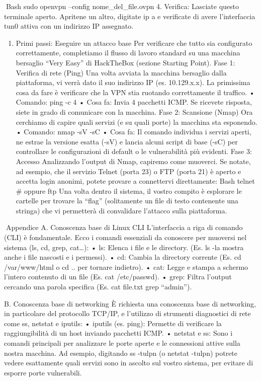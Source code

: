 \documentclass[11pt,a4paper]{article}
\providecommand{\tightlist}{%
  \setlength{\itemsep}{0pt}\setlength{\parskip}{0pt}}
\begin{document}
Bash sudo openvpn --config nome\_del\_file.ovpn 4. Verifica: Lasciate
questo terminale aperto. Apritene un altro, digitate ip a e verificate
di avere l'interfaccia tun0 attiva con un indirizzo IP assegnato.

\begin{enumerate}
\def\labelenumi{\arabic{enumi}.}
\setcounter{enumi}{4}
\tightlist
\item
  Primi passi: Eseguire un attacco base Per verificare che tutto sia
  configurato correttamente, completiamo il flusso di lavoro standard su
  una macchina bersaglio ``Very Easy'' di HackTheBox (sezione Starting
  Point). Fase 1: Verifica di rete (Ping) Una volta avviata la macchina
  bersaglio dalla piattaforma, vi verrà dato il suo indirizzo IP (es.
  10.129.x.x). La primissima cosa da fare è verificare che la VPN stia
  ruotando correttamente il traffico. • Comando: ping -c 4 • Cosa fa:
  Invia 4 pacchetti ICMP. Se ricevete risposta, siete in grado di
  comunicare con la macchina. Fase 2: Scansione (Nmap) Ora cerchiamo di
  capire quali servizi (e su quali porte) la macchina sta esponendo. •
  Comando: nmap -sV -sC • Cosa fa: Il comando individua i servizi
  aperti, ne estrae la versione esatta (-sV) e lancia alcuni script di
  base (-sC) per controllare le configurazioni di default o le
  vulnerabilità più evidenti. Fase 3: Accesso Analizzando l'output di
  Nmap, capiremo come muoverci. Se notate, ad esempio, che il servizio
  Telnet (porta 23) o FTP (porta 21) è aperto e accetta login anonimi,
  potete provare a connettervi direttamente: Bash telnet \# oppure ftp
  Una volta dentro il sistema, il vostro compito è esplorare le cartelle
  per trovare la ``flag'' (solitamente un file di testo contenente una
  stringa) che vi permetterà di convalidare l'attacco sulla piattaforma.
\end{enumerate}

Appendice A. Conoscenza base di Linux CLI L'interfaccia a riga di
comando (CLI) è fondamentale. Ecco i comandi essenziali da conoscere per
muoversi nel sistema (ls, cd, grep, cat\ldots): • ls: Elenca i file e le
directory. (Es. ls -la mostra anche i file nascosti e i permessi). • cd:
Cambia la directory corrente (Es. cd /var/www/html o cd .. per tornare
indietro). • cat: Legge e stampa a schermo l'intero contenuto di un file
(Es. cat /etc/passwd). • grep: Filtra l'output cercando una parola
specifica (Es. cat file.txt \textbar{} grep ``admin'').

B. Conoscenza base di networking È richiesta una conoscenza base di
networking, in particolare del protocollo TCP/IP, e l'utilizzo di
strumenti diagnostici di rete come ss, netstat e iputils: • iputils (es.
ping): Permette di verificare la raggiungibilità di un host inviando
pacchetti ICMP. • netstat e ss: Sono i comandi principali per analizzare
le porte aperte e le connessioni attive sulla nostra macchina. Ad
esempio, digitando ss -tulpn (o netstat -tulpn) potrete vedere
esattamente quali servizi sono in ascolto sul vostro sistema, per
evitare di esporre porte vulnerabili.
\end{document}
